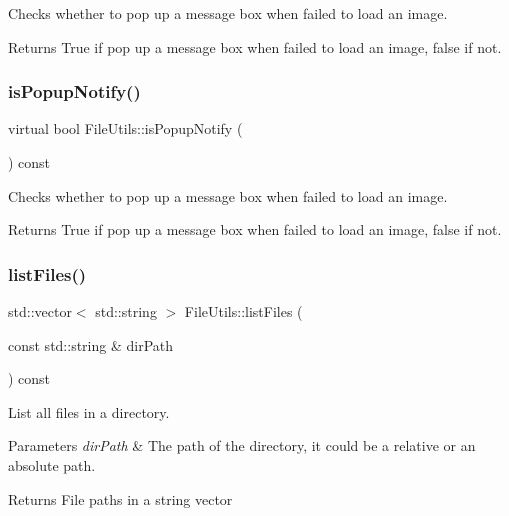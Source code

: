 Checks whether to pop up a message box when failed to load an image. \begin{DoxyReturn}{Returns}
True if pop up a message box when failed to load an image, false if not. 
\end{DoxyReturn}
\mbox{\label{classFileUtils_a969a59acf14d03cf424d20f31d709d9c}} 
\subsubsection{\texorpdfstring{is\+Popup\+Notify()}{isPopupNotify()}\hspace{0.1cm}{\footnotesize\ttfamily [2/2]}}
{\footnotesize\ttfamily virtual bool File\+Utils\+::is\+Popup\+Notify (\begin{DoxyParamCaption}{ }\end{DoxyParamCaption}) const\hspace{0.3cm}{\ttfamily [virtual]}}

Checks whether to pop up a message box when failed to load an image. \begin{DoxyReturn}{Returns}
True if pop up a message box when failed to load an image, false if not. 
\end{DoxyReturn}
\mbox{\label{classFileUtils_a88fc43b561884e12a9a2d41a9e3b4df4}} 
\subsubsection{\texorpdfstring{list\+Files()}{listFiles()}}
{\footnotesize\ttfamily std\+::vector$<$ std\+::string $>$ File\+Utils\+::list\+Files (\begin{DoxyParamCaption}\item[{const std\+::string \&}]{dir\+Path }\end{DoxyParamCaption}) const\hspace{0.3cm}{\ttfamily [virtual]}}

List all files in a directory.


\begin{DoxyParams}{Parameters}
{\em dir\+Path} & The path of the directory, it could be a relative or an absolute path. \\
\hline
\end{DoxyParams}
\begin{DoxyReturn}{Returns}
File paths in a string vector 
\end{DoxyReturn}


